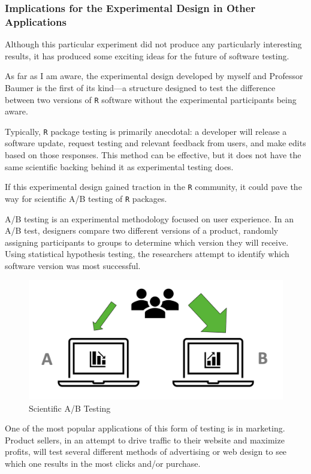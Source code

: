 \documentclass[12pt,twoside]{reedthesis}
\begin{document}
\hypertarget{implications-for-the-experimental-design-in-other-applications}{%
\subsubsection{Implications for the Experimental Design in Other Applications}\label{implications-for-the-experimental-design-in-other-applications}}

Although this particular experiment did not produce any particularly interesting results, it has produced some exciting ideas for the future of software testing.

As far as I am aware, the experimental design developed by myself and Professor Baumer is the first of its kind---a structure designed to test the difference between two versions of \texttt{R} software without the experimental participants being aware.

Typically, \texttt{R} package testing is primarily anecdotal: a developer will release a software update, request testing and relevant feedback from users, and make edits based on those responses. This method can be effective, but it does not have the same scientific backing behind it as experimental testing does.

If this experimental design gained traction in the \texttt{R} community, it could pave the way for scientific A/B testing of \texttt{R} packages.

A/B testing is an experimental methodology focused on user experience. In an A/B test, designers compare two different versions of a product, randomly assigning participants to groups to determine which version they will receive. Using statistical hypothesis testing, the researchers attempt to identify which software version was most successful.
\begin{figure}
\includegraphics[width=1\linewidth]{figure/a-b_testing} \caption{Scientific A/B Testing}\label{fig:unnamed-chunk-94}
\end{figure}
One of the most popular applications of this form of testing is in marketing. Product sellers, in an attempt to drive traffic to their website and maximize profits, will test several different methods of advertising or web design to see which one results in the most clicks and/or purchase.
\end{document}
